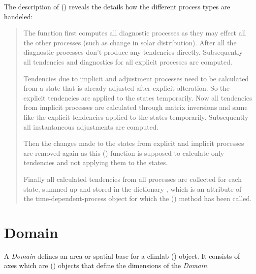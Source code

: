 \documentclass[a4paper,10pt,english]{sphinxmanual}
\begin{document}
The description of {\hyperref[api/climlab.process:climlab.process.time_dependent_process.TimeDependentProcess.compute]{\emph{}}} () reveals the details how the different process types are handeled:
\begin{quote}

The function first computes all diagnostic processes as they may effect
all the other processes (such as change in solar distribution).
After all the diagnostic processes don't produce any tendencies directly. Subsequently
all tendencies and diagnostics for all explicit processes are computed.

Tendencies due to implicit and adjustment processes need to be
calculated from a state that is already adjusted after explicit
alteration. So the explicit tendencies are applied to the states
temporarily. Now all tendencies from implicit processes are calculated
through matrix inversions and same like the explicit tendencies applied
to the states temporarily. Subsequently all instantaneous adjustments
are computed.

Then the changes made to the states from explicit and implicit
processes are removed again as this
{\hyperref[api/climlab.process:climlab.process.time_dependent_process.TimeDependentProcess.compute]{\emph{}}} ()
function is
supposed to calculate only tendencies and not applying them to the states.

Finally all calculated tendencies from all processes are collected
for each state, summed up and stored in the dictionary
, which is an attribute of the time-dependent-process
object for which the
{\hyperref[api/climlab.process:climlab.process.time_dependent_process.TimeDependentProcess.compute]{\emph{}}} ()
method has been called.
\end{quote}


\section{Domain}
\label{architecture:domain}
A \emph{Domain} defines an area or spatial base for a climlab {\hyperref[api/climlab.process:climlab.process.process.Process]{\emph{}}} () object. It consists of axes which
are {\hyperref[api/climlab.domain:climlab.domain.axis.Axis]{\emph{}}} () objects that define the dimensions of the \emph{Domain}.
\end{document}
